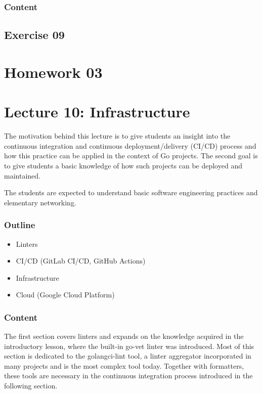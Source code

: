 \documentclass[
  digital,
  color,
  oneside,
  nosansbold,
  nocolorbold,
  lof,
  nolot,
]{fithesis4}
\begin{document}
\subsubsection{Content}

\subsection{Exercise 09}

\section{Homework 03}

\section{Lecture 10: Infrastructure}\label{lecture-infrastructure}

The motivation behind this lecture is to give students an insight into the continuous integration and continuous deployment/delivery (CI/CD) process and how this practice can be applied in the context of Go projects. The second goal is to give students a basic knowledge of how such projects can be deployed and maintained.

The students are expected to understand basic software engineering practices and elementary networking.

\subsubsection{Outline}

\begin{itemize}
    \item Linters
    \item CI/CD (GitLab CI/CD, GitHub Actions)
    \item Infrastructure
    \item Cloud (Google Cloud Platform)
\end{itemize}

\subsubsection{Content}

The first section covers linters and expands on the knowledge acquired in the introductory lesson, where the built-in go-vet linter was introduced. Most of this section is dedicated to the golangci-lint tool, a linter aggregator incorporated in many projects and is the most complex tool today. Together with formatters, these tools are necessary in the continuous integration process introduced in the following section.
\end{document}
